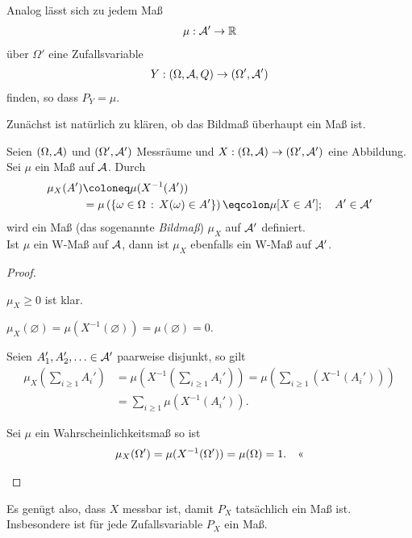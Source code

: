 Analog lässt sich zu jedem Maß
\begin{align*}
\mu:\AA'\to\R
\end{align*}
über $\Omega'$ eine Zufallsvariable
\begin{align*}
Y: (\Omega,\AA,Q)\to (\Omega',\AA')
\end{align*}
finden, so dass $P_Y=\mu$. 

\clearpage

Zunächst ist natürlich zu klären, ob das Bildmaß überhaupt ein Maß ist.

\begin{prop}
\label{prop:3.8}
Seien $(\Omega, \AA)$ und $ (\Omega ', \AA')$ Messräume und
 $X:(\Omega, \AA) \to (\Omega ', \AA')$ eine Abbildung. Sei $\mu$ ein
Maß auf $\AA$. Durch
\begin{align*}
\mu_{X}(A') & \defl  \mu(X^{-1}(A')) \\
              & =   \mu \left(\setdef{\omega \in \Omega}{X(\omega ) \in
              A'}\right) \defr \mu [ X \in A']; \quad A' \in \AA'
\end{align*}
wird ein Maß (das sogenannte \emph{Bildmaß}) $\mu _{X}$ auf $\AA'$
definiert.\\
Ist $\mu $ ein W-Maß auf $\AA$, dann ist $\mu _{X}$ ebenfalls ein W-Maß auf
$\AA'$.\fishhere
\end{prop}
\begin{proof}
\begin{proofenumroman}
  \item $\mu_X \ge 0$ ist klar.
  \item $\mu_X(\varnothing) = \mu(X^{-1}(\varnothing)) = \mu(\varnothing) = 0$.
  \item Seien $A_1',A_2',\ldots\in\AA'$ paarweise disjunkt, so gilt
\begin{align*}
\mu_X\left(\sum\limits_{i\ge 1} A_i'\right) &= 
\mu\left(X^{-1}\left(\sum\limits_{i\ge 1} A_i'\right)\right)
= \mu\left(\sum\limits_{i\ge 1}\left(X^{-1}(A_i')\right)\right)\\
&= \sum\limits_{i\ge 1}\mu\left(X^{-1}(A_i')\right).
\end{align*}
\item Sei $\mu$ ein Wahrscheinlichkeitsmaß so ist
\begin{align*}
\mu_X(\Omega') = \mu(X^{-1}(\Omega')) = \mu(\Omega) = 1.\qedhere
\end{align*}
\end{proofenumroman}
\end{proof}

Es genügt also, dass $X$ messbar ist, damit $P_X$ tatsächlich ein Maß ist.
Insbesondere ist für jede Zufallsvariable $P_X$ ein Maß.

